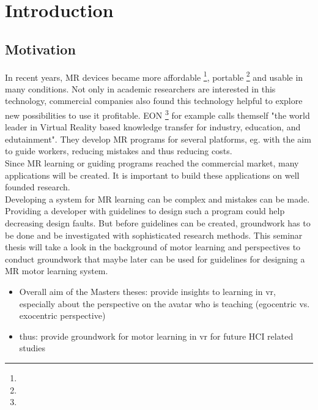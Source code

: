 \chapter{Introduction}

\section{Motivation}
In recent years, MR devices became more affordable \footnote{\todo}, portable \footnote{\todo} and usable in many conditions. Not only in academic researchers are interested in this technology, commercial companies also found this technology helpful to explore new possibilities to use it profitable. EON \footnote{\todo} for example calls themself "the world leader in Virtual Reality based knowledge transfer for industry, education, and edutainment". They develop MR programs for several platforms, eg. with the aim to guide workers, reducing mistakes and thus reducing costs.\\
Since MR learning or guiding programs reached the commercial market, many applications will be created. It is important to build these applications on well founded research.\\ 
Developing a system for MR learning can be complex and mistakes can be made. Providing a developer with guidelines to design such a program could help decreasing design faults. But before guidelines can be created, groundwork has to be done and be investigated with sophisticated research methods.
This seminar thesis will take a look in the background of motor learning and perspectives to conduct groundwork that maybe later can be used for guidelines for designing a MR motor learning system.
\begin{itemize}
	\item Overall aim of the Masters theses: provide insights to learning in vr, especially about the perspective on the avatar who is teaching (egocentric vs. exocentric perspective)	
	\item thus: provide groundwork for motor learning in vr for future HCI related studies
\end{itemize}

